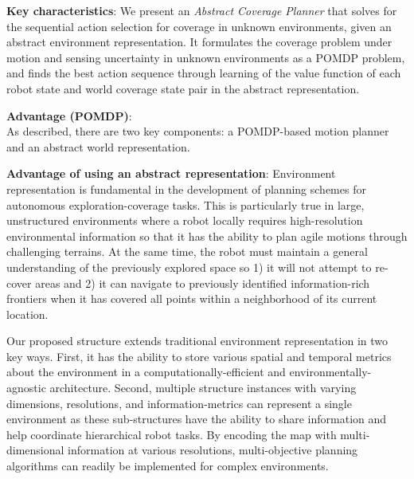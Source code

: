 \documentclass{article}
\newcommand{\ph}[1]{{\textbf{#1}:}} %
\begin{document}
\ph{Key characteristics} 
%
We present an \textit{Abstract Coverage Planner} that solves for the sequential action selection for coverage in unknown environments, given an abstract environment representation.
It formulates the coverage problem under motion and sensing uncertainty in unknown environments as a POMDP problem, and finds the best action sequence through learning of the value function of each robot state and world coverage state pair in the abstract representation.

\ph{Advantage (POMDP)} \\
%
As described, there are two key components: a POMDP-based motion planner and an abstract world representation.


\ph{Advantage of using an abstract representation} Environment representation is fundamental in the development of planning schemes for autonomous exploration-coverage tasks. This is particularly true in large, unstructured environments where a robot locally requires high-resolution environmental information so that it has the ability to plan agile motions through challenging terrains. At the same time, the robot must maintain a general understanding of the previously explored space so 1) it will not attempt to re-cover areas and 2) it can navigate to previously identified information-rich frontiers when it has covered all points within a neighborhood of its current location. 

Our proposed structure extends traditional environment representation in two key ways. First, it has the ability to store various spatial and temporal metrics about the environment in a computationally-efficient and environmentally-agnostic architecture. Second, multiple structure instances with varying dimensions, resolutions, and information-metrics can represent a single environment as these sub-structures have the ability to share information and help coordinate hierarchical robot tasks. By encoding the map with multi-dimensional information at various resolutions, multi-objective planning algorithms can readily be implemented for complex environments.  
\end{document}
